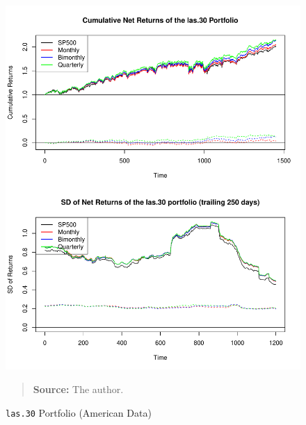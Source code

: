 \documentclass[preprint, doubleblind, authoryear,10pt]{elsarticle}
\begin{document}
\begin{figure}[htpb]
\centering
\footnotesize
\caption{\texttt{las.30} Portfolio (American Data)}
\label{fig:spy:las.30}
\includegraphics[width=.95\linewidth]{./figs/SP500-retac-las-30.pdf}
\begin{quote}
\textbf{Source:} The author.
\end{quote}
\end{figure}
\end{document}
